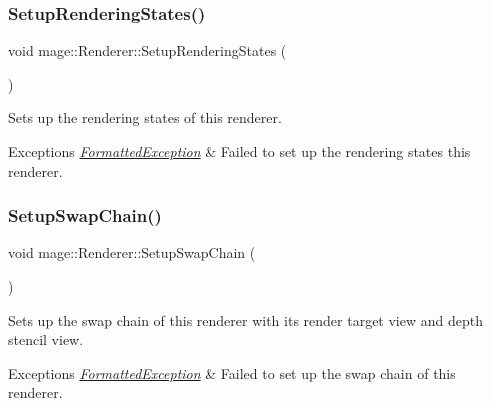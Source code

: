 \subsubsection{\texorpdfstring{Setup\+Rendering\+States()}{SetupRenderingStates()}}
{\footnotesize\ttfamily void mage\+::\+Renderer\+::\+Setup\+Rendering\+States (\begin{DoxyParamCaption}{ }\end{DoxyParamCaption})\hspace{0.3cm}{\ttfamily [private]}}

Sets up the rendering states of this renderer.


\begin{DoxyExceptions}{Exceptions}
{\em \hyperlink{structmage_1_1_formatted_exception}{Formatted\+Exception}} & Failed to set up the rendering states this renderer. \\
\hline
\end{DoxyExceptions}
\hypertarget{classmage_1_1_renderer_a8d3030611390f69120f1e5b91225eddf}{}\label{classmage_1_1_renderer_a8d3030611390f69120f1e5b91225eddf} 
\subsubsection{\texorpdfstring{Setup\+Swap\+Chain()}{SetupSwapChain()}}
{\footnotesize\ttfamily void mage\+::\+Renderer\+::\+Setup\+Swap\+Chain (\begin{DoxyParamCaption}{ }\end{DoxyParamCaption})\hspace{0.3cm}{\ttfamily [private]}}

Sets up the swap chain of this renderer with its render target view and depth stencil view.


\begin{DoxyExceptions}{Exceptions}
{\em \hyperlink{structmage_1_1_formatted_exception}{Formatted\+Exception}} & Failed to set up the swap chain of this renderer. \\
\hline
\end{DoxyExceptions}
\hypertarget{classmage_1_1_renderer_ab60757e174f0f82089361a0d46a1eacc}{}\label{classmage_1_1_renderer_ab60757e174f0f82089361a0d46a1eacc} 
